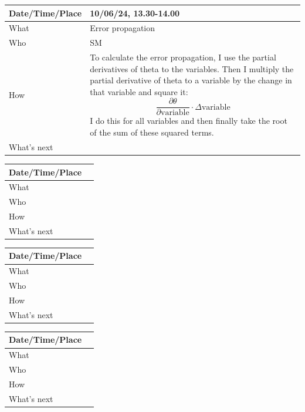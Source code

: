 \documentclass{article}
\begin{document}
\begin{table}[H]
\begin{tabular}{|p{1.5in}|p{4in}|}
\hline
Date/Time/Place &  10/06/24, 13.30-14.00\\ \hline
What            &  Error propagation\\ \hline
Who             &  SM\\ \hline
How             &   To calculate the error propagation, I use the partial derivatives of theta to the variables. Then I multiply the partial derivative of theta to a variable by the change in that variable and square it: $$\frac{\partial\theta}{\partial \text{variable}}\cdot\Delta\text{variable}$$ I do this for all variables and then finally take the root of the sum of these squared terms.\\ \hline
What's next     &  \\ \hline
\end{tabular}
\end{table}

\begin{table}[H]
\begin{tabular}{|p{1.5in}|p{4in}|}
\hline
Date/Time/Place &  \\ \hline
What            &  \\ \hline
Who             &  \\ \hline
How             &  \\ \hline
What's next     &  \\ \hline
\end{tabular}
\end{table}

\begin{table}[H]
\begin{tabular}{|p{1.5in}|p{4in}|}
\hline
Date/Time/Place &  \\ \hline
What            &  \\ \hline
Who             &  \\ \hline
How             &  \\ \hline
What's next     &  \\ \hline
\end{tabular}
\end{table}

\begin{table}[H]
\begin{tabular}{|p{1.5in}|p{4in}|}
\hline
Date/Time/Place &  \\ \hline
What            &  \\ \hline
Who             &  \\ \hline
How             &  \\ \hline
What's next     &  \\ \hline
\end{tabular}
\end{table}
\end{document}
